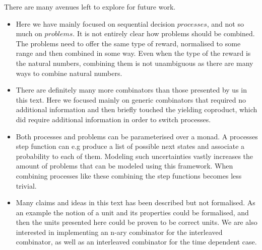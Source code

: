 \documentclass[sigplan,review]{acmart}\settopmatter{printfolios=true,printccs=false,printacmref=false}
\newcommand{\Varid}[1]{\mathit{#1}}
\begin{document}
%
There are many avenues left to explore for future work.
%
\begin{itemize}
  \item Here we have mainly focused on sequential decision \ensuremath{\Varid{processes}}, and not so much on \ensuremath{\Varid{problems}}. It is not entirely clear how problems should be combined. The problems need to offer the same type of reward, normalised to some range and then combined in some way. Even when the type of the reward is the natural numbers, combining them is not unambiguous as there are many ways to combine natural numbers.
  \item There are definitely many more combinators than those presented by us in this text. Here we focused mainly on generic combinators that required no additional information and then briefly touched the yielding coproduct, which did require additional information in order to switch processes.
  \item Both processes and problems can be parameterised over a monad. A processes step function can e.g produce a list of possible next states and associate a probability to each of them. Modeling such uncertainties vastly increases the amount of problems that can be modeled using this framework. When combining processes like these combining the step functions becomes less trivial.
  \item Many claims and ideas in this text has been described but not formalised. As an example the notion of a unit and its properties could be formalised, and then the units presented here could be proven to be correct units. We are also interested in implementing an n-ary combinator for the interleaved combinator, as well as an interleaved combinator for the time dependent case.
\end{itemize}
\end{document}
